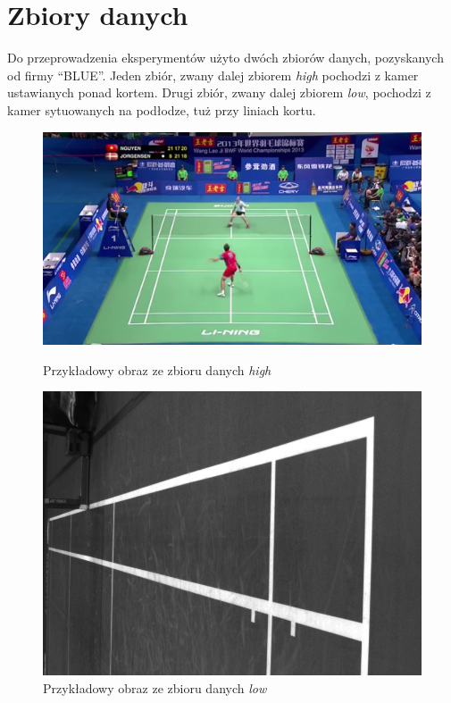 \newpage
\section{Zbiory danych}

Do przeprowadzenia eksperymentów użyto dwóch zbiorów danych, pozyskanych od firmy ``BLUE''. Jeden zbiór, zwany dalej zbiorem \textit{high} pochodzi z kamer ustawianych ponad kortem. Drugi zbiór, zwany dalej zbiorem \textit{low}, pochodzi z kamer sytuowanych na podłodze, tuż przy liniach kortu.

\begin{figure}[!htb]
    \includegraphics[width=\linewidth]{../badminton/datasets/badminton_high/train/test_court2-00002.png}
    \caption{Przykładowy obraz ze zbioru danych \textit{high}}
  \endminipage\hfill
    \includegraphics[width=\linewidth]{../badminton/datasets/badminton_low/train/1564909032792410075.jpg}
    \caption{Przykładowy obraz ze zbioru danych \textit{low}}
  \endminipage\hfill
\end{figure}

